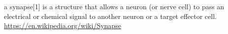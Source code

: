 \documentclass[a4paper]{article}
\title{}
\date{}
\begin{document}
    \maketitle
     a synapse[1] is a structure that allows a neuron (or nerve cell) to pass an electrical or chemical signal to another neuron or a target effector cell. 
    \url{https://en.wikipedia.org/wiki/Synapse}
\end{document}
